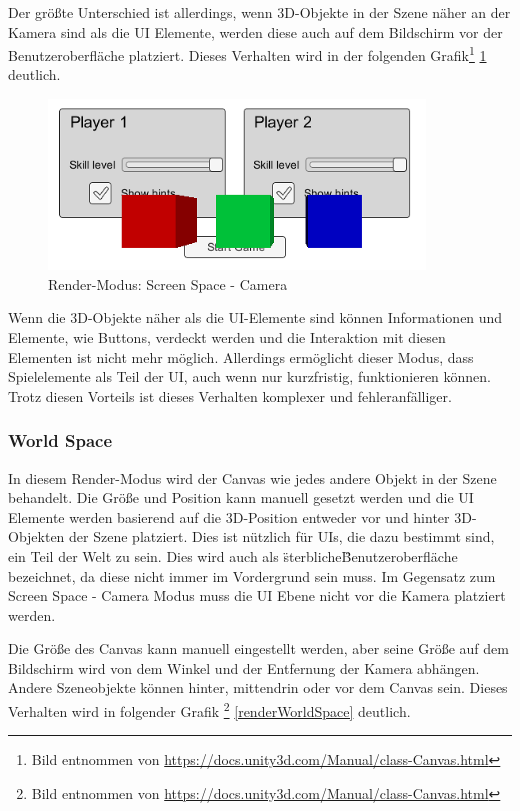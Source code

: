 			Der größte Unterschied ist allerdings, wenn 3D-Objekte in der Szene näher an der Kamera sind als die UI Elemente, werden diese auch auf dem Bildschirm vor der Benutzeroberfläche platziert. Dieses Verhalten wird in der folgenden Grafik\footnote{Bild entnommen von \url{https://docs.unity3d.com/Manual/class-Canvas.html}} \ref{renderCamera} deutlich.
			
			\begin{figure}[htbp]
				\centering 
				\label{renderCamera}
				\includegraphics[width=10cm]{pics/CanvasCamera.png}
				\caption{Render-Modus: Screen Space - Camera}
			\end{figure}
		
			Wenn die 3D-Objekte näher als die UI-Elemente sind können Informationen und Elemente, wie Buttons, verdeckt werden und die Interaktion mit diesen Elementen ist nicht mehr möglich. Allerdings ermöglicht dieser Modus, dass Spielelemente als Teil der UI, auch wenn nur kurzfristig, funktionieren können. Trotz diesen Vorteils ist dieses Verhalten komplexer und fehleranfälliger.
		
		\subsubsection{World Space}
			In diesem Render-Modus wird der Canvas wie jedes andere Objekt in der Szene behandelt. Die Größe und Position kann manuell gesetzt werden und die UI Elemente werden basierend auf die 3D-Position entweder vor und hinter 3D-Objekten der Szene platziert. Dies ist nützlich für UIs, die dazu bestimmt sind, ein Teil der Welt zu sein. Dies wird auch als \"sterbliche\" Benutzeroberfläche bezeichnet, da diese nicht immer im Vordergrund sein muss. Im Gegensatz zum Screen Space - Camera Modus muss die UI Ebene nicht vor die Kamera platziert werden.
			
			Die Größe des Canvas kann manuell eingestellt werden, aber seine Größe auf dem Bildschirm wird von dem Winkel und der Entfernung der Kamera abhängen. Andere Szeneobjekte können hinter, mittendrin oder vor dem Canvas sein. Dieses Verhalten wird in folgender Grafik \footnote{Bild entnommen von \url{https://docs.unity3d.com/Manual/class-Canvas.html}} \ref{renderWorldSpace} deutlich.
			
